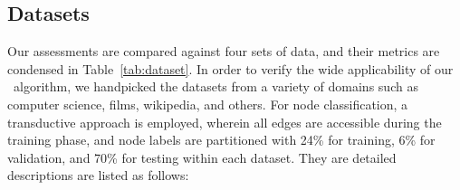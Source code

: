 \subsection{Datasets} \label{sec:datasets}
Our assessments are compared against four sets of data, and their metrics are condensed in Table~\ref{tab:dataset}. 
In order to verify the wide applicability of our \alg\ algorithm, we handpicked the datasets from a variety of domains such as computer science, films, wikipedia, and others.
%
For node classification, a transductive approach is employed, wherein all edges are accessible during the training phase, and node labels are partitioned with 24\% for training, 6\% for validation, and 70\% for testing within each dataset.
%
They are detailed descriptions are listed as follows:
